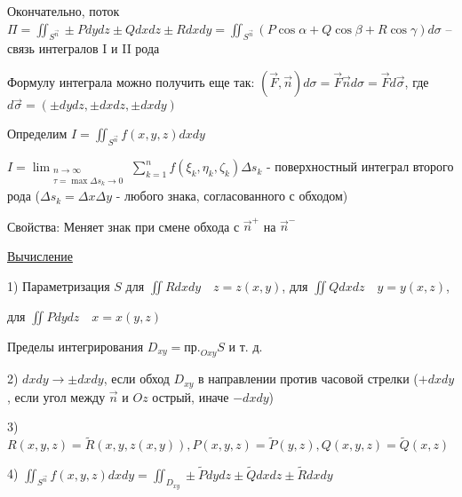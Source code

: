 \documentclass[12pt]{article}
\begin{document}
\begin{enumerate}[label*=\textbf{\arabic** }]
    \hypertarget{connectionbetweensurfaceintegral}{}

    Окончательно, поток $\Pi = \iint_{S^{\vec{n}}} \pm Pdydz \pm Qdxdz \pm Rdxdy = \iint_{S^{\vec{n}}} (P\cos\alpha + Q\cos\beta + R\cos\gamma) d\sigma$ -- связь интегралов I и II рода

    \Nota Формулу интеграла можно получить еще так: $(\overrightarrow{F}, \overrightarrow{n})d\sigma = \overrightarrow{F}\overrightarrow{n}d\sigma = \overrightarrow{F}d\overrightarrow{\sigma}$, где $d\overrightarrow{\sigma} = (\pm dydz, \pm dxdz, \pm dxdy)$

    \hypertarget{surfaceintegralofsecondkindmath}{}


    Определим $I = \iint_{S^{\overrightarrow{n}}} f(x, y, z) dxdy$

    $I = \lim_{\substack{n \to \infty \\ \tau = \max \Delta s_k \to 0}} \sum_{k=1}^n f(\xi_k, \eta_k, \zeta_k) \Delta s_k$ - поверхностный интеграл второго рода
    ($\Delta s_k = \Delta x\Delta y$ - любого знака, согласованного с обходом)

    \hypertarget{surfaceintegralofsecondkindproperties}{}

    Свойства: Меняет знак при смене обхода с $\overrightarrow{n}^+$ на $\overrightarrow{n}^-$

    \hypertarget{surfaceintegralofsecondkindcalculation}{}

    \underline{Вычисление}

    1) Параметризация $S$ \quad для $\iint Rdxdy \quad z = z(x, y)$, для $\iint Qdxdz \quad y = y(x, z)$,

    для $\iint Pdydz \quad x = x(y, z)$

    Пределы интегрирования $D_{xy} = \text{пр.}_{Oxy} S$ и т. д.

    2) $dxdy \to \pm dxdy$, если обход $D_{xy}$ в направлении против часовой стрелки ($+dxdy$, если угол между $\overrightarrow{n}$ и $Oz$ острый, иначе $-dxdy$)

    3) $R(x, y, z) = \tilde{R}(x, y, z(x, y)), P(x, y, z) = \tilde{P}(y, z), Q(x, y, z) = \tilde{Q}(x, z)$

    4) $\iint_{S^{\overrightarrow{n}}} f(x, y, z) dxdy = \iint_{D_{xy}} \pm \tilde{P}dydz \pm \tilde{Q}dxdz \pm \tilde{R}dxdy$
    \end{enumerate}
\end{document}

